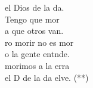 \documentclass[12pt]{article}
\begin{document}
\begin{multicols*}{2}
\begin{cancion}
\begin{chorus}
	 el Dios de la da.\\
	Tengo que mor\\
	a que otros van.\\
	ro morir no es mor\\
	o la gente entnde.\\
	morimos a la erra\\
	el D de la da elve. (**)\\
	\end{chorus}%
	\jump\\
\end{cancion}%


\end{multicols*}
\end{document}

